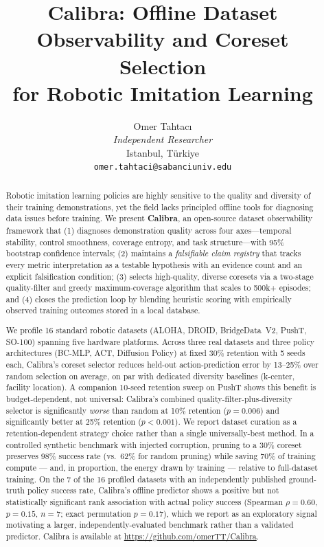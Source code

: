 \documentclass[10pt,twocolumn]{article}
\title{%
  \textbf{Calibra: Offline Dataset Observability and Coreset Selection\\
  for Robotic Imitation Learning}%
}
\author{%
  Omer Tahtac\i\\
  \textit{Independent Researcher}\\
  Istanbul, T\"urkiye\\
  \texttt{omer.tahtaci@sabanciuniv.edu}
}
\date{}
\begin{document}
\maketitle

\begin{abstract}
Robotic imitation learning policies are highly sensitive to the quality and
diversity of their training demonstrations, yet the field lacks principled
offline tools for diagnosing data issues before training.
We present \textbf{Calibra}, an open-source dataset observability framework
that (1) diagnoses demonstration quality across four axes---temporal
stability, control smoothness, coverage entropy, and task structure---with
95\% bootstrap confidence intervals; (2) maintains a \emph{falsifiable claim
registry} that tracks every metric interpretation as a testable hypothesis
with an evidence count and an explicit falsification condition; (3) selects
high-quality, diverse coresets via a two-stage quality-filter and greedy
maximum-coverage algorithm that scales to 500k+ episodes; and (4) closes the
prediction loop by blending heuristic scoring with empirically observed
training outcomes stored in a local database.

We profile 16 standard robotic datasets (ALOHA, DROID, BridgeData~V2, PushT,
SO-100) spanning five hardware platforms. Across three real datasets and
three policy architectures (BC-MLP, ACT, Diffusion Policy) at fixed 30\%
retention with 5 seeds each, Calibra's coreset selector reduces held-out
action-prediction error by 13--25\% over random selection on average, on par
with dedicated diversity baselines (k-center, facility location). A companion
10-seed retention sweep on PushT shows this benefit is budget-dependent, not
universal: Calibra's combined quality-filter-plus-diversity selector is
significantly \emph{worse} than random at 10\% retention ($p=0.006$) and
significantly better at 25\% retention ($p<0.001$). We report dataset
curation as a retention-dependent strategy choice rather than a single
universally-best method. In a controlled synthetic benchmark with injected
corruption, pruning to a 30\% coreset preserves 98\% success rate (vs.\ 62\%
for random pruning) while saving 70\% of training compute --- and, in
proportion, the energy drawn by training --- relative to full-dataset
training. On the 7 of the 16 profiled datasets with an independently
published ground-truth policy success rate, Calibra's offline predictor
shows a positive but not statistically significant rank association with
actual policy success (Spearman $\rho = 0.60$, $p = 0.15$, $n = 7$; exact
permutation $p = 0.17$), which we report as an exploratory signal motivating
a larger, independently-evaluated benchmark rather than a validated
predictor.
Calibra is available at \url{https://github.com/omerTT/Calibra}.
\end{abstract}
\end{document}
